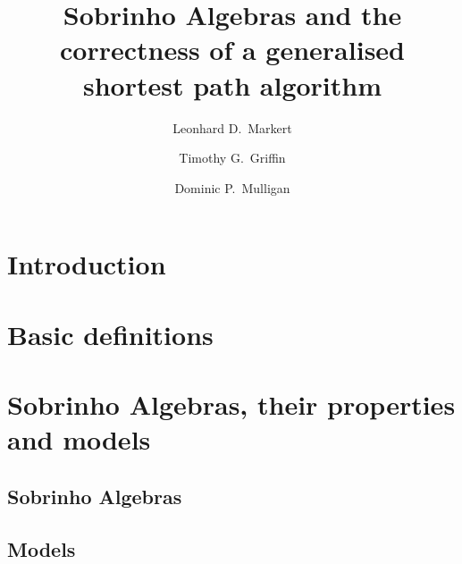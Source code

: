 \documentclass{llncs}
\begin{document}

\title{Sobrinho Algebras and the correctness of a generalised shortest path algorithm}
\author{Leonhard D.~Markert \and Timothy G.~Griffin \and Dominic P.~Mulligan}

\maketitle

\begin{abstract}

\end{abstract}

\section{Introduction}
\label{sect.introduction}



\section{Basic definitions}
\label{sect.basic.definitions}



\section{Sobrinho Algebras, their properties and models}
\label{sect.path.algebras.their.properties.and.models}

\subsection{Sobrinho Algebras}
\label{subsect.path.algebras}



\subsection{Models}
\label{subsect.models}
\end{document}
